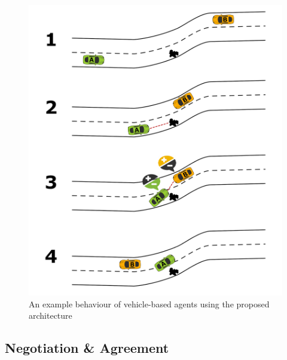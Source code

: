 \documentclass[main.tex]{subfiles}
\begin{document}
\begin{figure}[htbp]
    \centering
    \includegraphics[width=.8\textwidth]{AgentPlanning.png}
    \caption{An example behaviour of vehicle-based agents using the proposed architecture}
    \label{agentReplanning}
\end{figure}

\clearpage

\subsection{Negotiation \& Agreement}
\end{document}
